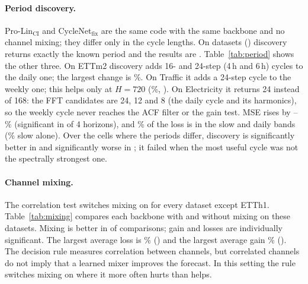 \documentclass[11pt,a4paper]{article}
\begin{document}
\paragraph{Period discovery.}
Pro-Lin$_{\text{CI}}$ and CycleNet$_{\text{fix}}$ are the same code with the same backbone and no channel mixing; they differ only in the cycle lengths. On \vPeriodSameCount{} datasets (\vPeriodSameList) discovery returns exactly the known period and the results are \vPeriodIdentical. Table~\ref{tab:period} shows the other three. On ETTm2 discovery adds 16- and 24-step (4\,h and 6\,h) cycles to the daily one; the largest change is \vPeriodETTmTwoMaxAbs\%. On Traffic it adds a 24-step cycle to the weekly one; this helps only at $H=720$ (\vPeriodTrafficSevenTwenty\%, \vPeriodTrafficSevenTwentySig). On Electricity it returns 24 instead of 168: the FFT candidates are 24, 12 and 8 (the daily cycle and its harmonics), so the weekly cycle never reaches the ACF filter or the gain test. MSE rises by \vPeriodElecMin--\vPeriodElecMax\% (significant in \vPeriodElecSig{} of 4 horizons), and \vPeriodElecSlowDailyShare\% of the loss is in the slow and daily bands (\vPeriodElecSlowShare\% slow alone). Over the \vPeriodTests{} cells where the periods differ, discovery is significantly better in \vPeriodSigBetter{} and significantly worse in \vPeriodElecSig{}; it failed when the most useful cycle was not the spectrally strongest one.

\begin{table}[t]
\centering
\scriptsize
\setlength{\tabcolsep}{4pt}

\caption{\textbf{Period discovery versus the known cycle length} (Linear backbone, no channel mixing), on the three datasets where discovery returns a different period. $^{*}$ significant (Holm-adjusted $p<0.05$, same sign on all seeds). On the other five datasets the two models are identical.}
\label{tab:period}
\end{table}

\paragraph{Channel mixing.}
The correlation test switches mixing on for every dataset except ETTh1. Table~\ref{tab:mixing} compares each backbone with and without mixing on these \vMixDatasets{} datasets. Mixing is better in \vMixWins{} of \vMixCells{} comparisons; \vMixSigBetter{} gain and \vMixSigWorse{} losses are individually significant. The largest average loss is \vMixWorstVal\% (\vMixWorstWhere) and the largest average gain \vMixBestVal\% (\vMixBestWhere). The decision rule measures correlation between channels, but correlated channels do not imply that a learned mixer improves the forecast. In this setting the rule switches mixing on where it more often hurts than helps.
\end{document}
